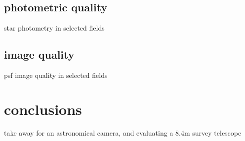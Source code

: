 \subsection{photometric quality}

star photometry in selected fields

\subsection{image quality}

psf image quality in selected fields

\section{conclusions}

take away for an astronomical camera, and evaluating a 8.4m survey telescope




